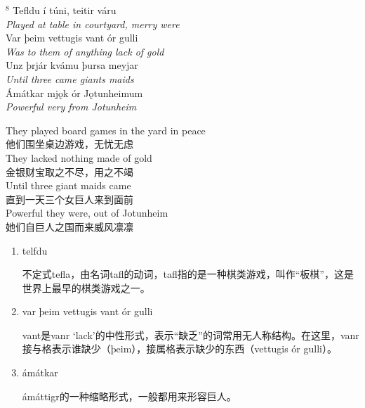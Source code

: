 \begin{paracol}{2}
    \noindent
    $^8 $ Tefldu í túni, teitir váru\\
    \textit{Played at table in courtyard, merry were}\\
    Var þeim vettugis vant ór gulli\\
    \textit{Was to them of anything lack of gold}\\
    Unz þrjár kvámu þursa meyjar\\
    \textit{Until three came giants maids}\\
    Ámátkar mjǫk ór Jǫtunheimum\\
    \textit{Powerful very from Jotunheim}\\

    \switchcolumn

    \noindent
    They played board games in the yard in peace\\
    他们围坐桌边游戏，无忧无虑\\
    They lacked nothing made of gold\\
    金银财宝取之不尽，用之不竭\\
    Until three giant maids came\\
    直到一天三个女巨人来到面前\\
    Powerful they were, out of Jotunheim\\
    她们自巨人之国而来威风凛凛\\

\end{paracol}

\begin{grammar*}{}
    \begin{enumerate}[leftmargin=*]
        \item telfdu

              不定式tefla，由名词tafl的动词，tafl指的是一种棋类游戏，叫作“板棋”，这是世界上最早的棋类游戏之一。

        \item var þeim vettugis vant ór gulli

              vant是vanr `lack'的中性形式，表示“缺乏”的词常用无人称结构。在这里，vanr接与格表示谁缺少（þeim），接属格表示缺少的东西（vettugis ór gulli）。
        \item ámátkar

              ámáttigr的一种缩略形式，一般都用来形容巨人。
    \end{enumerate}
\end{grammar*}